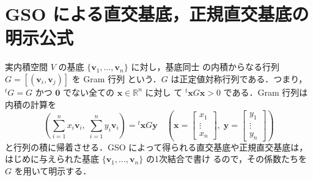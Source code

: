 \documentclass[11pt, uplatex, dvipdfmx]{jsarticle}
\theoremstyle{definition}
\begin{document}
\section{GSO による直交基底，正規直交基底の明示公式}

実内積空間 $V$ の基底 $\{\bm{v}_1, \ldots, \bm{v}_n\}$ に対し，基底同士
の内積からなる行列 $G=\left[ (\bm{v}_i, \bm{v}_j)\right]$ を Gram 行列
という．$G$ は正定値対称行列である．つまり，${}^{t}G =
G$ かつ $\bm{0}$ でない全ての $\bm{x} \in \mathbb{R}^n$ に対し
て ${}^{t}\bm{x} G \bm{x} >0$ である．Gram 行列は内積の計算を
\[
  \left( \sum_{i=1}^{n} x_i \bm{v}_i,\;  \sum_{i=1}^{n} y_i
    \bm{v}_i\right)  = {}^{t}\bm{x} G \bm{y} \quad \left( \bm{x} =\left[
    \begin{array}{c}
      x_1\\
      \vdots\\
      x_n
    \end{array}
  \right], \; \bm{y} = \left[
    \begin{array}{c}
      y_1\\
      \vdots\\
      y_n
    \end{array}
  \right]\right)
\]
と行列の積に帰着させる．GSO によって得られる直交基底や正規直交基底は，
はじめに与えられた基底 $\{\bm{v}_1, \ldots, \bm{v}_n\}$ の1次結合で書け
るので，その係数たちを $G$ を用いて明示する．
\end{document}
